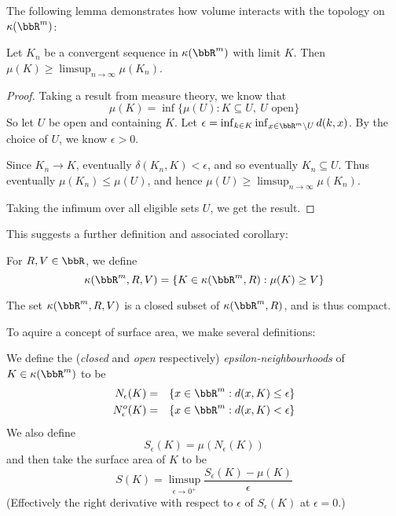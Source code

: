 \documentclass[a4paper,11pt]{article}
\begin{document}
The following lemma demonstrates how volume interacts with the topology on
$\kappa(\bbR^m)$:

\begin{lemma}
\label{thm:upperContinuityOfVolume}
Let $K_n$ be a convergent sequence in $\kappa(\bbR^m)$ with limit $K$.  Then
$\mu(K)\geq\limsup_{n\to\infty}\mu(K_n)$.
\end{lemma}

\begin{proof}
Taking a result from measure theory, we know that
\[
\mu(K)=\inf\{\mu(U):K\subseteq U,\ U \textrm{ open}\}
\]
So let $U$ be open and containing $K$.  Let
$\epsilon=\inf_{k\in K}\inf_{x\in\bbR^m\setminus U}d(k,x)$.  By the choice of
$U$, we know $\epsilon>0$.

Since $K_n\to K$, eventually $\delta(K_n,K)<\epsilon$, and so eventually
$K_n\subseteq U$.
Thus eventually $\mu(K_n)\leq\mu(U)$, and hence
$\mu(U)\geq\limsup_{n\to\infty}\mu(K_n)$.

Taking the infimum over all eligible sets $U$, we get the result.
\end{proof}

This suggests a further definition and associated corollary:

\begin{defn}
For $R,V\in\bbR$, we define
\[
\kappa(\bbR^m,R,V)=\{K\in\kappa(\bbR^m,R):\mu(K)\geq V\}
\]
\end{defn}

\begin{corollary}
\label{thm:volumeBoundedSpaces}
The set $\kappa(\bbR^m,R,V)$ is a closed subset of $\kappa(\bbR^m,R)$, and is
thus compact.
\end{corollary}

To aquire a concept of surface area, we make several definitions:

\begin{defn}
We define the (\emph{closed} and \emph{open} respectively)
\emph{epsilon-neighbourhoods} of $K\in\kappa(\bbR^m)$ to be
\begin{eqnarray*}
N_\epsilon(K)&=&\{x\in\bbR^m:d(x,K)\leq \epsilon\} \\
N_\epsilon^o(K)&=&\{x\in\bbR^m:d(x,K)<\epsilon\}
\end{eqnarray*}
We also define
\[
S_\epsilon(K)=\mu(N_\epsilon(K))
\]
and then take the surface area of $K$ to be
\[
S(K)=\limsup_{\epsilon\to0^+}\frac{S_\epsilon(K)-\mu(K)}{\epsilon}
\]
(Effectively the right derivative with respect to $\epsilon$ of $S_\epsilon(K)$
at $\epsilon=0$.)
\end{defn}
\end{document}
